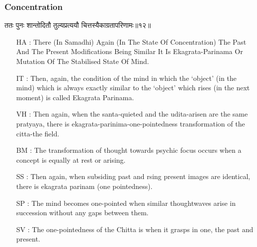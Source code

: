 \begin{frame}[fragile]\frametitle{Concentration}
\begin{sanskrit}
ततः पुनः शान्तोदितौ तुल्यप्रत्ययौ चित्तस्यैकाग्रतापरिणामः॥१२॥
\end{sanskrit}

	\begin{itemize}
	\item [HA]: There (In Samadhi) Again (In The State Of Concentration) The Past And The Present Modifications Being Similar It Is Ekagrata-Parinama Or Mutation Of The Stabilised State Of Mind.
	\item [IT]: Then, again, the condition of the mind in which the ‘object’ (in the mind) which is always exactly similar to the ‘object’ which rises (in the next moment) is called Ekagrata Parinama.
	\item [VH]: Then again, when the santa-quieted and the udita-arisen are the same pratyaya, there is ekagrata-parinima-one-pointedness transformation of the citta-the field.
	\item [BM]: The transformation of thought towards psychic focus occurs when a concept is equally at rest or arising.
	\item [SS]: Then again, when subsiding past and rsing present images are identical, there is ekagrata parinam (one pointedness).
	\item [SP]: The mind becomes one-pointed when similar thoughtwaves arise in succession without any gaps between them.
	\item [SV]: The one-pointedness of the Chitta is when it grasps in one, the past and present.
	\end{itemize}
\end{frame}


